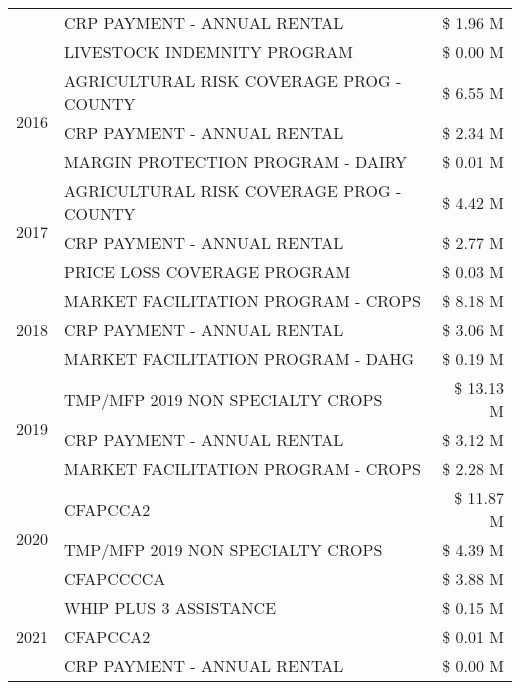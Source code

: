 \begin{tabular}{llr}
 & CRP PAYMENT - ANNUAL RENTAL & \$ 1.96 M \\
 & LIVESTOCK INDEMNITY PROGRAM & \$ 0.00 M \\
\cline{1-3}
\multirow[t]{3}{*}{2016} & AGRICULTURAL RISK COVERAGE PROG - COUNTY & \$ 6.55 M \\
 & CRP PAYMENT - ANNUAL RENTAL & \$ 2.34 M \\
 & MARGIN PROTECTION PROGRAM - DAIRY & \$ 0.01 M \\
\cline{1-3}
\multirow[t]{3}{*}{2017} & AGRICULTURAL RISK COVERAGE PROG - COUNTY & \$ 4.42 M \\
 & CRP PAYMENT - ANNUAL RENTAL & \$ 2.77 M \\
 & PRICE LOSS COVERAGE PROGRAM & \$ 0.03 M \\
\cline{1-3}
\multirow[t]{3}{*}{2018} & MARKET FACILITATION PROGRAM - CROPS & \$ 8.18 M \\
 & CRP PAYMENT - ANNUAL RENTAL & \$ 3.06 M \\
 & MARKET FACILITATION PROGRAM - DAHG & \$ 0.19 M \\
\cline{1-3}
\multirow[t]{3}{*}{2019} & TMP/MFP 2019 NON SPECIALTY CROPS & \$ 13.13 M \\
 & CRP PAYMENT - ANNUAL RENTAL & \$ 3.12 M \\
 & MARKET FACILITATION PROGRAM - CROPS & \$ 2.28 M \\
\cline{1-3}
\multirow[t]{3}{*}{2020} & CFAPCCA2 & \$ 11.87 M \\
 & TMP/MFP 2019 NON SPECIALTY CROPS & \$ 4.39 M \\
 & CFAPCCCCA & \$ 3.88 M \\
\cline{1-3}
\multirow[t]{3}{*}{2021} & WHIP PLUS 3 ASSISTANCE & \$ 0.15 M \\
 & CFAPCCA2 & \$ 0.01 M \\
 & CRP PAYMENT - ANNUAL RENTAL & \$ 0.00 M \\
\cline{1-3}
\bottomrule
\end{tabular}
